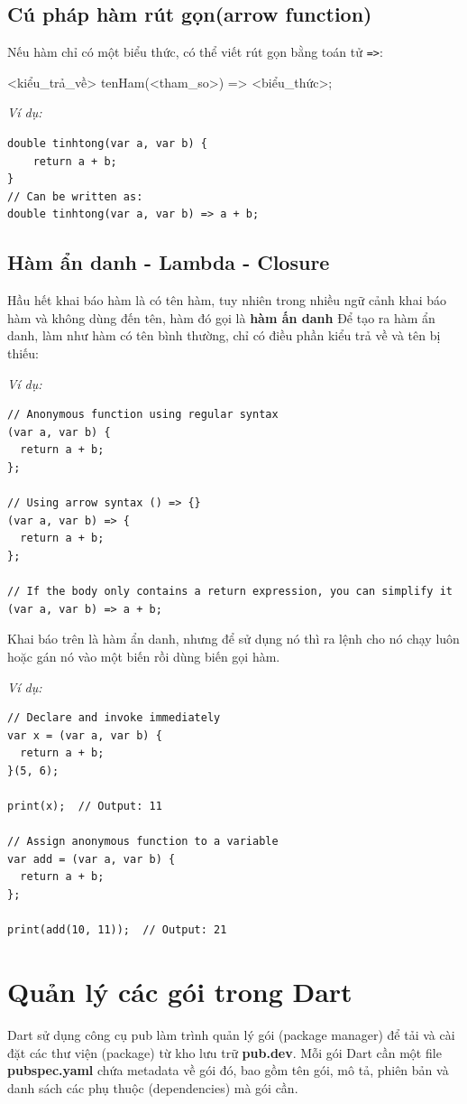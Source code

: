 \documentclass[../DoAn.tex]{subfiles}
\numberwithin{figure}{chapter}
\begin{document}
\subsection{Cú pháp hàm rút gọn(arrow function)}
Nếu hàm chỉ có một biểu thức, có thể viết rút gọn bằng toán tử \texttt{=>}:

\begin{myverbatim}
<kiểu_trả_về> tenHam(<tham_so>) => <biểu_thức>;
\end{myverbatim}

\textit{Ví dụ:}
\begin{lstlisting}
double tinhtong(var a, var b) {
    return a + b;
}
// Can be written as:
double tinhtong(var a, var b) => a + b;
\end{lstlisting}

\subsection{Hàm ẩn danh - Lambda - Closure}
Hầu hết khai báo hàm là có tên hàm, tuy nhiên trong nhiều ngữ cảnh khai báo hàm và không dùng đến tên, hàm đó gọi là \textbf{hàm ấn danh}
Để tạo ra hàm ẩn danh, làm như hàm có tên bình thường, chỉ có điều phần kiểu trả về và tên bị thiếu: 

\textit{Ví dụ:}
\begin{lstlisting}
// Anonymous function using regular syntax
(var a, var b) {
  return a + b;
};

// Using arrow syntax () => {}
(var a, var b) => {
  return a + b;
};

// If the body only contains a return expression, you can simplify it
(var a, var b) => a + b;
\end{lstlisting}

Khai báo trên là hàm ẩn danh, nhưng để sử dụng nó thì ra lệnh cho nó chạy luôn hoặc gán nó vào một biến rồi dùng biến gọi hàm. 

\textit{Ví dụ:}
\begin{lstlisting}
// Declare and invoke immediately
var x = (var a, var b) {
  return a + b;
}(5, 6);

print(x);  // Output: 11

// Assign anonymous function to a variable
var add = (var a, var b) {
  return a + b;
};

print(add(10, 11));  // Output: 21
\end{lstlisting}

\section{Quản lý các gói trong Dart}
Dart sử dụng công cụ pub làm trình quản lý gói (package manager) để tải và cài đặt các thư viện (package) từ kho lưu trữ \textbf{pub.dev}. Mỗi gói Dart cần một file \textbf{pubspec.yaml} chứa metadata về gói đó, bao gồm tên gói, mô tả, phiên bản và danh sách các phụ thuộc (dependencies) mà gói cần. 
\end{document}
